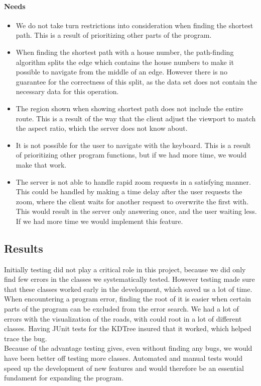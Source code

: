 \documentclass[a4paper,10pt,titlepage]{article}
\begin{document}
\paragraph{Needs}
\begin{itemize}
\item We do not take turn restrictions into consideration when finding the shortest path. This is a result of prioritizing other parts of the program.

\item When finding the shortest path with a house number, the path-finding algorithm splits the edge which contains the house numbers to make it possible to navigate from the middle of an edge. However there is no guarantee for the correctness of this split, as the data set does not contain the necessary data for this operation.

\item The region shown when showing shortest path does not include the entire route. This is a result of the way that the client adjust the viewport to match the aspect ratio, which the server does not know about.

\item It is not possible for the user to navigate with the keyboard. This is a result of prioritizing other program functions, but if we had more time, we would make that work.

\item The server is not able to handle rapid zoom requests in a satisfying manner. This could be handled by making a time delay after the user requests the zoom, where the client waits for another request to overwrite the first with. This would result in the server only answering once, and the user waiting less. If we had more time we would implement this feature.
		\end{itemize}


			
			
		\subsection{Results}
		Initially testing did not play a critical role in this project, because we did only find few errors in the classes we systematically tested. However testing made sure that these classes worked early in the development, which saved us a lot of time. When encountering a program error, finding the root of it is easier when certain parts of the program can be excluded from the error search. We had a lot of errors with the visualization of the roads, with could root in a lot of different classes. Having JUnit tests for the KDTree insured that it worked, which helped trace the bug.\\
		Because of the advantage testing gives, even without finding any bugs, we would have been better off testing more classes. Automated and manual tests would speed up the development of new features and would therefore be an essential fundament for expanding the program. 
\end{document}
